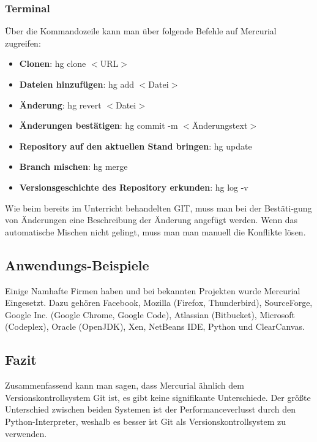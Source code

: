 \subsubsection{Terminal}
Über die Kommandozeile kann man über folgende Befehle auf Mercurial zugreifen:
\begin{itemize}
\item\textbf{Clonen}: hg clone \(<\)URL\(>\)
\item\textbf{Dateien hinzufügen}: hg add \(<\)Datei\(>\)
\item\textbf{Änderung}: hg revert \(<\)Datei\(>\)
\item\textbf{Änderungen bestätigen}: hg commit -m \(<\)Änderungstext\(>\)
\item\textbf{Repository auf den aktuellen Stand bringen}: hg update
\item\textbf{Branch mischen}: hg merge
\item\textbf{Versionsgeschichte des Repository erkunden}: hg log -v
\end{itemize}
Wie beim bereits im Unterricht behandelten GIT, muss man bei der Bestäti-gung von Änderungen eine Beschreibung der Änderung angefügt werden. Wenn das automatische Mischen nicht gelingt, muss man man manuell die Konflikte lösen.
\subsection{Anwendungs-Beispiele}
Einige Namhafte Firmen haben und bei bekannten Projekten wurde Mercurial Eingesetzt. Dazu gehören Facebook, Mozilla (Firefox, Thunderbird), SourceForge, Google Inc. (Google Chrome, Google Code), Atlassian (Bitbucket), Microsoft (Codeplex), Oracle (OpenJDK), Xen, NetBeans IDE, Python und ClearCanvas.  
\subsection{Fazit}
Zusammenfassend kann man sagen, dass Mercurial ähnlich dem Versionskontrollsystem Git ist, es gibt keine signifikante Unterschiede. Der größte Unterschied zwischen beiden Systemen ist der Performanceverlusst durch den Python-Interpreter, weshalb es besser ist Git als Versionskontrollsystem zu verwenden.
